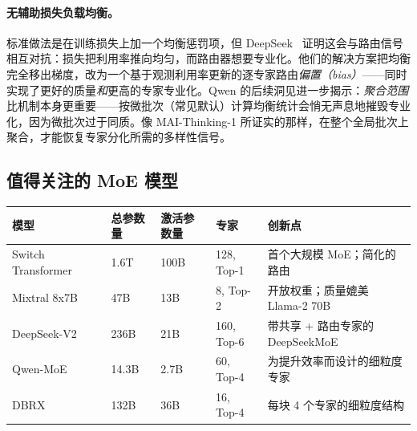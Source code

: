 \begin{keybox}[实际中使用的是哪种方法？]
\paragraph{无辅助损失负载均衡。}
标准做法是在训练损失上加一个均衡惩罚项，但 DeepSeek~\cite{wang2024auxfree} 证明这会与路由信号相互对抗：损失把利用率推向均匀，而路由器想要专业化。他们的解决方案把均衡完全移出梯度，改为一个基于观测利用率更新的逐专家路由\emph{偏置（bias）}——同时实现了更好的质量\emph{和}更高的专家专业化。Qwen 的后续洞见进一步揭示：\emph{聚合范围}比机制本身更重要——按微批次（常见默认）计算均衡统计会悄无声息地摧毁专业化，因为微批次过于同质。像 MAI-Thinking-1 所证实的那样，在整个全局批次上聚合，才能恢复专家分化所需的多样性信号。
\end{keybox}

\subsection{值得关注的 MoE 模型}
\label{notable-moe-models}

\noindent\begin{tabularx}{\linewidth}{@{}l Z{0.47} Z{0.47} Z{0.62} Z{2.44}@{}}
\toprule
\textbf{模型} & \textbf{总参数量} & \textbf{激活参数量} & \textbf{专家} & \textbf{创新点} \\
\midrule
Switch Transformer~\cite{fedus2022switch} & 1.6T & 100B & 128, Top-1 & 首个大规模 MoE；简化的路由 \\
Mixtral 8x7B~\cite{jiang2024mixtral} & 47B & 13B & 8, Top-2 & 开放权重；质量媲美 Llama-2 70B \\
DeepSeek-V2~\cite{deepseekv2} & 236B & 21B & 160, Top-6 & 带共享 + 路由专家的 DeepSeekMoE \\
Qwen-MoE~\cite{qwen2024qwen25} & 14.3B & 2.7B & 60, Top-4 & 为提升效率而设计的细粒度专家 \\
DBRX~\cite{databricks2024dbrx} & 132B & 36B & 16, Top-4 & 每块 4 个专家的细粒度结构 \\
\bottomrule
\end{tabularx}

